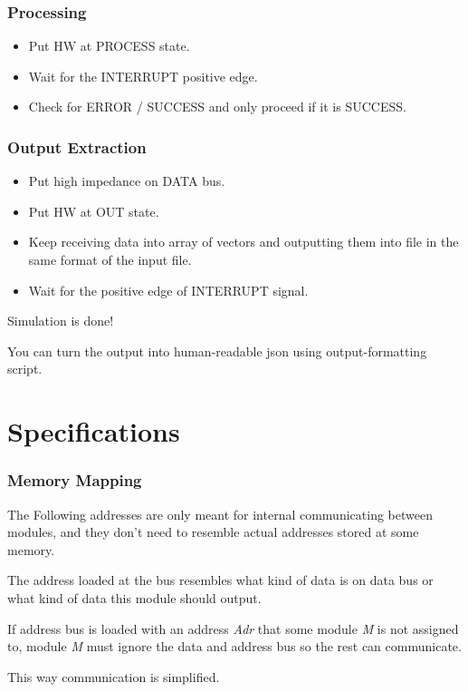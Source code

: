 \documentclass[12pt]{report}
\begin{document}
\section{Processing}
\begin{itemize}
    \item Put HW at PROCESS state.
    \item Wait for the {INTERRUPT} positive edge.
    \item Check for {ERROR / SUCCESS} and only proceed if it is SUCCESS.
\end{itemize}

\section{Output Extraction}
\begin{itemize}
    \item Put high impedance on {DATA} bus.
    \item Put HW at OUT state.
    \item Keep receiving data into array of vectors and outputting them into file in the same format of the input file.
    \item Wait for the positive edge of {INTERRUPT} signal. 
\end{itemize}

Simulation is done! 

You can turn the output into human-readable json using output-formatting script.

\part{Specifications}

\section{Memory Mapping}
The Following addresses are only meant for internal communicating between modules, and they don't need to resemble actual addresses stored at some memory. 

The address loaded at the bus resembles what kind of data is on data bus or what kind of data this module should output.

If address bus is loaded with an address \emph{Adr} that some module \emph{M} is not assigned to, module \emph{M} must ignore the data and address bus so the rest can communicate.

This way communication is simplified.
\end{document}
